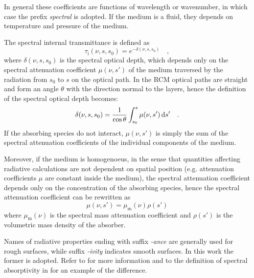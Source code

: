 \documentclass[a4paper,10pt,twocolumn,\classoptions]{article}
\begin{document}
In general these coefficients are functions of wavelength or wavenumber, in which case the prefix \emph{spectral} is adopted. If the medium is a fluid, they depends on temperature and pressure of the medium.

The spectral internal transmittance is defined as
\begin{equation}
  \label{eq:spectral_internal_transmittance}
  \tau_\text{i}(\nu, s, s_0) = e^{-\delta(\nu, s, s_0)}
  \quad ,
\end{equation}
where $\delta(\nu, s, s_0)$ is the spectral optical depth, which depends only on the spectral attenuation coefficient $\mu(\nu, s')$ of the medium traversed by the radiation from $s_0$ to $s$ on the optical path. In the RCM optical paths are straight and form an angle $\theta$ with the direction normal to the layers, hence the definition of the spectral optical depth becomes:
\begin{equation}
  \label{eq:spectral_optical_depth}
  \delta(\nu, s, s_0) = \frac{1}{\cos \theta} \int_{s_0}^{s} \mu(\nu, s') \odif{s'}
  \quad .
\end{equation}
If the absorbing species do not interact, $\mu(\nu, s')$ is simply the sum of the spectral attenuation coefficients of the individual components of the medium.

Moreover, if the medium is homogenoeus, in the sense that quantities affecting radiative calculations are not dependent on spatial position (e.g. attenuation coefficients $\mu$ are constant inside the medium), the spectral attenuation coefficient depends only on the concentration of the absorbing species, hence the spectral attenuation coefficient can be rewritten as
\begin{equation}
  \label{eq:spectral_attenuation_coefficient}
  \mu(\nu, s') = \mu_\text{m}(\nu) \rho(s')
\end{equation}
where $\mu_\text{m}(\nu)$ is the spectral mass attenuation coefficient and $\rho(s')$ is the volumetric mass density of the absorber.

Names of radiative properties ending with suffix \emph{-ance} are generally used for rough surfaces, while suffix \emph{-ivity} indicates smooth surfaces. In this work the former is adopted. Refer to \cite[59]{Modest} for more information and to the definition of spectral absorptivity in \cite{CIE} for an example of the difference.
\end{document}
